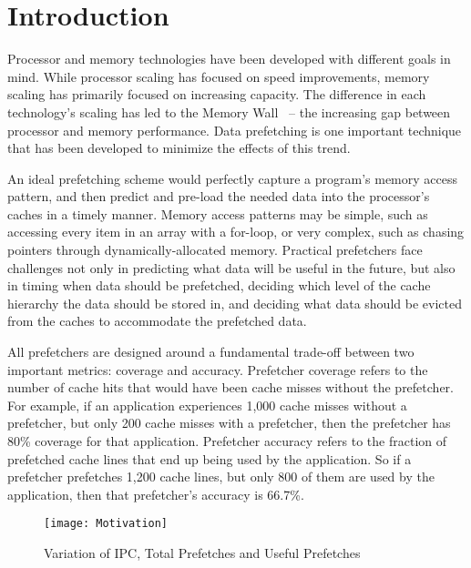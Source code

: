 \section{Introduction}
\label{Introduction}

Processor and memory technologies have been developed with different
goals in mind.  While processor scaling has focused on speed improvements,
memory scaling has primarily focused on increasing capacity.  The
difference in each technology's scaling has led to the Memory Wall~\cite{MemWall}
-- the increasing gap between processor and memory performance. Data prefetching
is one important technique that has been developed to minimize the effects 
of this trend.


An ideal prefetching scheme would perfectly capture a program's memory access pattern, and then
predict and pre-load the needed data into the processor's caches in a timely manner. 
Memory access patterns may be simple, such as accessing every item in an array with a for-loop,
or very complex, such as chasing pointers through dynamically-allocated memory.
Practical prefetchers face challenges not only in predicting what data will be useful in the future,
but also in timing when data should be prefetched, deciding which level of the cache hierarchy
the data should be stored in, and deciding what data should be evicted from the caches to accommodate
the prefetched data.

All prefetchers are designed around a fundamental trade-off between two important metrics:
coverage and accuracy.  Prefetcher coverage refers to the number of cache hits that would have
been cache misses without the prefetcher.  For example, if an application experiences 1,000 cache misses
without a prefetcher, but only 200 cache misses with a prefetcher, then the prefetcher has 80\%
coverage for that application.  Prefetcher accuracy refers to the fraction of prefetched cache lines
that end up being used by the application.  So if a prefetcher prefetches 1,200 cache lines, 
but only 800 of them are used by the application, then that prefetcher's accuracy is 66.7\%.


\begin{figure}[t]
\texttt{[image: Motivation]}
\caption{Variation of IPC, Total Prefetches and Useful Prefetches}
\label{Fig:Motivation}
\end{figure}

